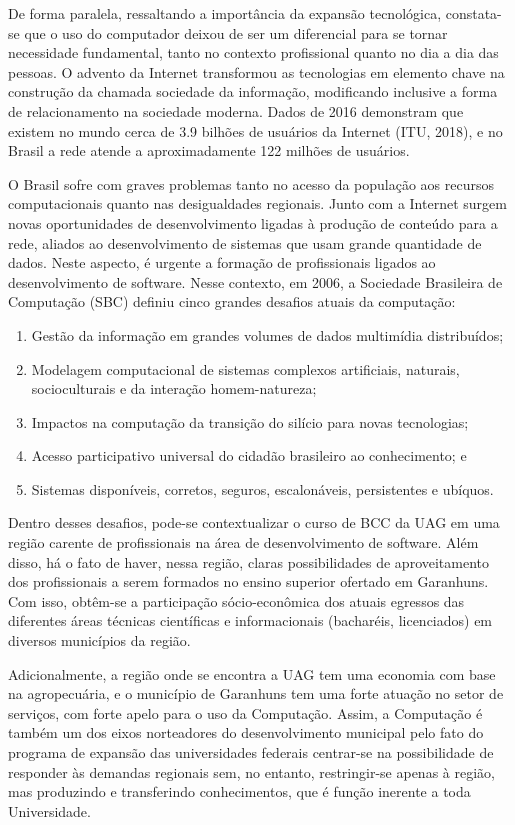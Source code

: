 \documentclass[
	12pt,				%
	openright,			%
  oneside,     %
	a4paper,			%
	chapter=TITLE,		%
	english,			%
	french,				%
	spanish,			%
	brazil				%
	]{abntex2}
\begin{document}
De forma paralela, ressaltando a importância da  expansão  tecnológica,  constata-se que o uso do computador deixou de ser um diferencial para se tornar necessidade fundamental, tanto no contexto profissional quanto no dia a dia das pessoas. O advento da Internet transformou as tecnologias em elemento chave na construção da chamada sociedade da informação, modificando inclusive a forma de relacionamento na sociedade moderna. Dados de 2016 demonstram que existem no mundo cerca de 3.9 bilhões de usuários da Internet (ITU, 2018), e no Brasil a rede atende a aproximadamente 122 milhões de usuários.

O Brasil sofre com graves problemas tanto no acesso da população aos recursos computacionais quanto nas desigualdades regionais. Junto com a Internet surgem novas oportunidades de desenvolvimento ligadas à produção de conteúdo para a rede, aliados ao desenvolvimento de sistemas que usam grande quantidade de dados. Neste aspecto, é urgente a formação de profissionais ligados ao desenvolvimento de software. Nesse contexto, em 2006, a Sociedade Brasileira de Computação (SBC) definiu cinco grandes desafios atuais da computação:

\begin{enumerate}
    \item Gestão da informação em grandes volumes de dados multimídia distribuídos;
    \item Modelagem computacional de sistemas complexos artificiais, naturais, socioculturais e da interação homem-natureza;
    \item Impactos na computação da transição do silício para novas tecnologias;
    \item Acesso participativo universal do cidadão brasileiro ao conhecimento; e
    \item Sistemas disponíveis, corretos, seguros, escalonáveis, persistentes e ubíquos.
\end{enumerate}
	
Dentro desses desafios, pode-se contextualizar o curso de BCC da UAG em uma região carente de profissionais na área de desenvolvimento de software. Além disso, há o fato de haver, nessa região, claras possibilidades de aproveitamento dos profissionais a serem formados no ensino superior ofertado em Garanhuns. Com isso, obtêm-se a participação sócio-econômica dos atuais egressos das diferentes áreas técnicas científicas e informacionais (bacharéis, licenciados) em diversos municípios da região.

Adicionalmente, a região onde se encontra a UAG tem uma economia com base na agropecuária, e o município de Garanhuns tem uma forte atuação no setor de serviços, com forte apelo para o uso da Computação. Assim, a Computação é também um dos eixos norteadores do desenvolvimento municipal pelo fato do programa de expansão das universidades federais centrar-se na possibilidade de responder às demandas regionais sem, no entanto, restringir-se apenas à região, mas produzindo e transferindo conhecimentos, que é função inerente a toda Universidade.
\end{document}
